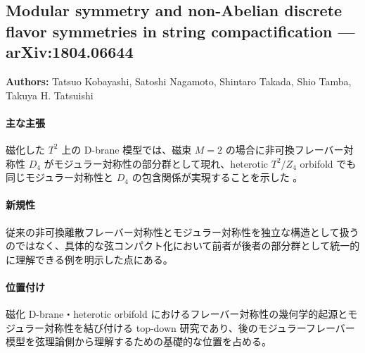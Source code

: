 \subsection{Modular symmetry and non-Abelian discrete flavor symmetries in string compactification --- arXiv:1804.06644}

\textbf{Authors:} Tatsuo Kobayashi, Satoshi Nagamoto, Shintaro Takada, Shio Tamba, Takuya H. Tatsuishi

\paragraph{主な主張}
磁化した $T^2$ 上の D-brane 模型では、磁束 $M=2$ の場合に非可換フレーバー対称性 $D_4$ がモジュラー対称性の部分群として現れ、heterotic $T^2/Z_4$ orbifold でも同じモジュラー対称性と $D_4$ の包含関係が実現することを示した \cite{Kobayashi:2018rad}。

\paragraph{新規性}
従来の非可換離散フレーバー対称性とモジュラー対称性を独立な構造として扱うのではなく、具体的な弦コンパクト化において前者が後者の部分群として統一的に理解できる例を明示した点にある。

\paragraph{位置付け}
磁化 D-brane・heterotic orbifold におけるフレーバー対称性の幾何学的起源とモジュラー対称性を結び付ける top-down 研究であり、後のモジュラーフレーバー模型を弦理論側から理解するための基礎的な位置を占める。
